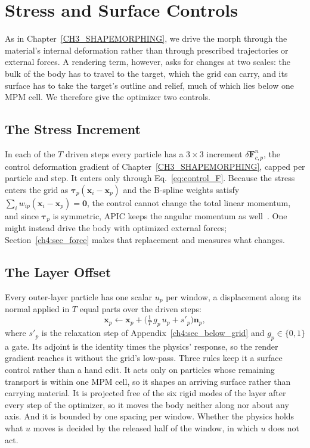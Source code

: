 \section{Stress and Surface Controls}
\label{ch4:sec_controls}

As in Chapter~\ref{CH3_SHAPEMORPHING}, we drive the morph through the material's internal deformation rather than
through prescribed trajectories or external forces. A rendering term, however, asks for changes at two scales: the bulk
of the body has to travel to the target, which the grid can carry, and its surface has to take the target's outline and
relief, much of which lies below one MPM cell. We therefore give the optimizer two controls.

\subsection{The Stress Increment}
In each of the $T$ driven steps every particle has a $3\times3$ increment $\delta\mathbf{F}^{n}_{c,p}$, the control
deformation gradient of Chapter~\ref{CH3_SHAPEMORPHING}, capped per particle and step. It enters only through
Eq.~\eqref{eq:control_F}. Because the stress enters the grid as $\boldsymbol{\tau}_p(\mathbf{x}_i-\mathbf{x}_p)$ and the
B-spline weights satisfy $\sum_i w_{ip}(\mathbf{x}_i-\mathbf{x}_p)=\mathbf{0}$, the control cannot change the total linear
momentum, and since $\boldsymbol{\tau}_p$ is symmetric, APIC keeps the angular momentum as well~\citep{jiang2016material}.
One might instead drive the body with optimized external forces; Section~\ref{ch4:sec_force} makes that replacement and
measures what changes.

\subsection{The Layer Offset}
Every outer-layer particle has one scalar $u_p$ per window, a displacement along its normal applied in $T$ equal parts
over the driven steps:
\begin{equation}
\label{ch4:eq_u}
\mathbf{x}_p\leftarrow\mathbf{x}_p+\Big(\tfrac{1}{T}\,g_p\,u_p+s'_p\Big)\mathbf{n}_p ,
\end{equation}
where $s'_p$ is the relaxation step of Appendix~\ref{ch4:sec_below_grid} and $g_p\in\{0,1\}$ a gate. Its adjoint is the
identity times the physics' response, so the render gradient reaches it without the grid's low-pass. Three rules keep it a
surface control rather than a hand edit. It acts only on particles whose remaining transport is within one MPM cell, so it
shapes an arriving surface rather than carrying material. It is projected free of the six rigid modes of the layer after
every step of the optimizer, so it moves the body neither along nor about any axis. And it is bounded by one spacing per
window. Whether the physics holds what $u$ moves is decided by the released half of the window, in which $u$ does not act.

